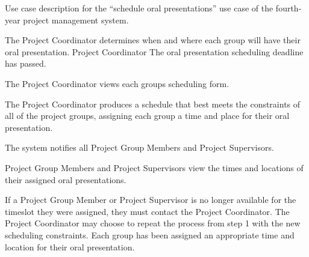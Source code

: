 \begin{table}
  \centering
  \caption{Use case description for the ``schedule oral presentations'' use case of the fourth-year project management system.}
  \label{tbl:use-case-schedule-orals}

  \begin{usecase}
    The Project Coordinator determines when and where each group will have their oral presentation.
    Project Coordinator
    The oral presentation scheduling deadline has passed.
    \ucnormal
    \begin{ucenum}
      \item The Project Coordinator views each groups scheduling form.
      \item The Project Coordinator produces a schedule that best meets the constraints of all of the project groups, assigning each group a time and place for their oral presentation.
      \item The system notifies all Project Group Members and Project Supervisors.
      \item Project Group Members and Project Supervisors view the times and locations of their assigned oral presentations.
    \end{ucenum}
    If a Project Group Member or Project Supervisor is no longer available for the timeslot they were assigned, they must contact the Project Coordinator. The Project Coordinator may choose to repeat the process from step 1 with the new scheduling constraints.
    Each group has been assigned an appropriate time and location for their oral presentation.
  \end{usecase}
\end{table}


